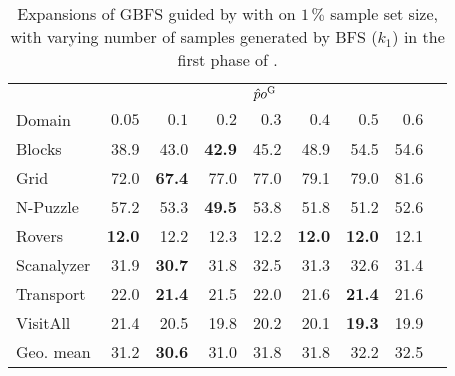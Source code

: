 \begin{table}[!h]
\centering
\caption[Expansions of \pog with varying values of $k_{1}$]{Expansions of GBFS guided by \hnn with \pog on $1\,\%$ sample set size, with varying number of samples generated by BFS ($k_{1}$) in the first phase of \bfsrs.}
\label{tab:bfsss_pct}
\vspace{\baselineskip}
\begin{tabular}{lrrrrrrrr}
\toprule
& \multicolumn{7}{c}{$\hat po^{\text{G}}$} \\
\cmidrule(lr){2-8}
Domain     & $0.05$ &$0.1$ & $0.2$   & $0.3$ & $0.4$ & $0.5$ & $0.6$ \\ \midrule
Blocks     & 38.9   & 43.0  & \textbf{42.9}  & 45.2  & 48.9  & 54.5  & 54.6  \\
Grid       & 72.0   & \textbf{67.4}  & 77.0  & 77.0  & 79.1  & 79.0  & 81.6  \\
N-Puzzle   & 57.2   & 53.3  & \textbf{49.5}  & 53.8  & 51.8  & 51.2  & 52.6  \\
Rovers     & \textbf{12.0}   & 12.2  & 12.3  & 12.2  & \textbf{12.0}  & \textbf{12.0}  & 12.1  \\
Scanalyzer & 31.9   & \textbf{30.7}  & 31.8  & 32.5  & 31.3  & 32.6  & 31.4  \\
Transport  & 22.0   & \textbf{21.4}  & 21.5  & 22.0  & 21.6  & \textbf{21.4}  & 21.6  \\
VisitAll   & 21.4   & 20.5  & 19.8  & 20.2  & 20.1  & \textbf{19.3}  & 19.9  \\ \midrule
Geo. mean  & 31.2   & \textbf{30.6}  & 31.0  & 31.8  & 31.8  & 32.2  & 32.5  \\ \bottomrule
\end{tabular}
\end{table}
